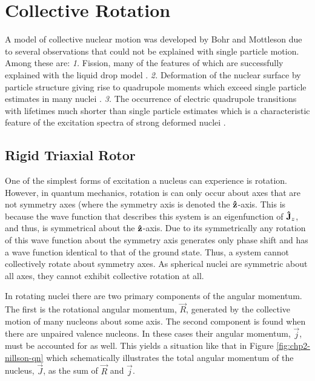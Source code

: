 \section{Collective Rotation}
\label{sec:models-rigid-rotor}
A model of collective nuclear motion was developed by Bohr and Mottleson \cite{bohrMottelson2,bohrMottelsonArticle} due to several observations that could not be explained with single particle motion. Among these are: \emph{1.} Fission, many of the features of which are successfully explained with the liquid drop model \cite{meitnerFissionProducts,fissionMechanism}. \emph{2.} Deformation of the nuclear surface by particle structure \cite{deformationPrediction} giving rise to quadrupole moments which exceed single particle estimates in many nuclei \cite{casimirQuadMoments,nuclearQuadMomentsAndShellStruc}. \emph{3.} The occurrence of electric quadrupole \gr{} transitions with lifetimes much shorter than single particle estimates \cite{nuclearIsomerClassification} which is a characteristic feature of the excitation spectra of strong deformed nuclei \cite{QuadIsomerInterp}.
\subsection{Rigid Triaxial Rotor}
\label{sec:models-triaxial-rotor}
One of the simplest forms of excitation a nucleus can experience is rotation. However, in quantum mechanics, rotation is can only occur about axes that are not symmetry axes (where the symmetry axis is denoted the $\boldsymbol{\hat{\textbf{z}}}$-axis. This is because the wave function that describes this system is an eigenfunction of $\boldsymbol{\hat{\textbf{J}}}_z$, and thus, is symmetrical about the $\boldsymbol{\hat{\textbf{z}}}$-axis. Due to its symmetrically any rotation of this wave function about the symmetry axis generates only phase shift and has a wave function identical to that of the ground state. Thus, a system cannot collectively rotate about symmetry axes. As spherical nuclei are symmetric about all axes, they cannot exhibit collective rotation at all.

In rotating nuclei there are two primary components of the angular momentum. The first is the rotational angular momentum, $\vec{R}$, generated by the collective motion of many nucleons about some axis. The second component is found when there are unpaired valence nucleons. In these cases their angular momentum, $\vec{j}$, must be accounted for as well. This yields a situation like that in Figure \ref{fig:chp2-nillson-qn} which schematically illustrates the total angular momentum of the nucleus, $\vec{J}$, as the sum of $\vec{R}$ and $\vec{j}$.


